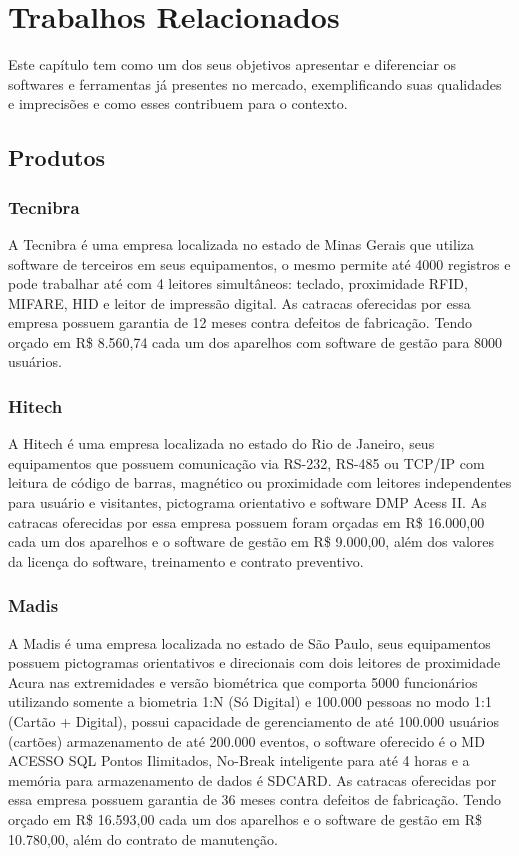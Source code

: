 \section{Trabalhos Relacionados}
Este capítulo tem como um dos seus objetivos apresentar e diferenciar os softwares e ferramentas já presentes no mercado, exemplificando suas qualidades e imprecisões e como esses contribuem para o contexto.

\subsection{Produtos}
\subsubsection{Tecnibra}
A Tecnibra é uma empresa localizada no estado de Minas Gerais que utiliza software de terceiros em seus equipamentos, o mesmo permite até 4000 registros e pode trabalhar até com 4 leitores simultâneos: teclado, proximidade RFID, MIFARE, HID e leitor de impressão digital. As catracas oferecidas por essa empresa possuem garantia de 12 meses contra defeitos de fabricação. Tendo orçado em R\$ 8.560,74 cada um dos aparelhos com software de gestão para 8000 usuários.
\subsubsection{Hitech}
A Hitech é uma empresa localizada no estado do Rio de Janeiro, seus equipamentos que possuem
comunicação via RS-232, RS-485 ou TCP/IP com leitura de código de barras,
magnético ou proximidade com leitores independentes para usuário e visitantes,
pictograma orientativo e software DMP Acess II. As catracas oferecidas por essa empresa possuem foram orçadas em R\$ 16.000,00 cada um dos aparelhos e o software de gestão em R\$ 9.000,00, além dos valores da licença do software, treinamento e contrato preventivo.
\subsubsection{Madis}
A Madis é uma empresa localizada no estado de São Paulo, seus equipamentos possuem pictogramas orientativos e direcionais com dois leitores de
proximidade Acura nas extremidades e versão biométrica que comporta 5000
funcionários utilizando somente a biometria 1:N (Só Digital) e 100.000 pessoas no
modo 1:1 (Cartão + Digital), possui capacidade de gerenciamento de até 100.000
usuários (cartões) armazenamento de até 200.000 eventos, o software oferecido é o
MD ACESSO SQL Pontos Ilimitados, No-Break inteligente para até 4 horas e a
memória para armazenamento de dados é SDCARD. As catracas oferecidas por essa empresa possuem garantia de 36 meses contra defeitos de fabricação. Tendo orçado em R\$ 16.593,00 cada um dos aparelhos e o software de gestão em R\$ 10.780,00, além do contrato de manutenção.

